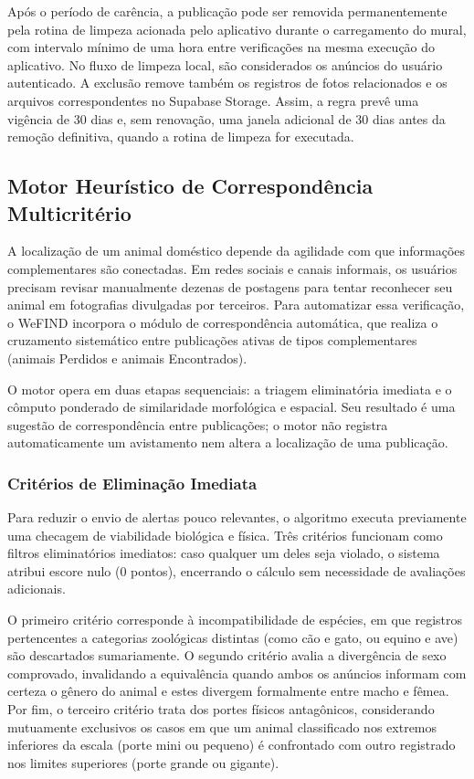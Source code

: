 Após o período de carência, a publicação pode ser removida permanentemente pela rotina de limpeza acionada pelo aplicativo durante o carregamento do mural, com intervalo mínimo de uma hora entre verificações na mesma execução do aplicativo. No fluxo de limpeza local, são considerados os anúncios do usuário autenticado. A exclusão remove também os registros de fotos relacionados e os arquivos correspondentes no Supabase Storage. Assim, a regra prevê uma vigência de 30 dias e, sem renovação, uma janela adicional de 30 dias antes da remoção definitiva, quando a rotina de limpeza for executada.

\subsection{Motor Heurístico de Correspondência Multicritério}

A localização de um animal doméstico depende da agilidade com que informações complementares são conectadas. Em redes sociais e canais informais, os usuários precisam revisar manualmente dezenas de postagens para tentar reconhecer seu animal em fotografias divulgadas por terceiros. Para automatizar essa verificação, o WeFIND incorpora o módulo de correspondência automática, que realiza o cruzamento sistemático entre publicações ativas de tipos complementares (animais Perdidos e animais Encontrados).

O motor opera em duas etapas sequenciais: a triagem eliminatória imediata e o cômputo ponderado de similaridade morfológica e espacial. Seu resultado é uma sugestão de correspondência entre publicações; o motor não registra automaticamente um avistamento nem altera a localização de uma publicação.

\subsubsection{Critérios de Eliminação Imediata}

Para reduzir o envio de alertas pouco relevantes, o algoritmo executa previamente uma checagem de viabilidade biológica e física. Três critérios funcionam como filtros eliminatórios imediatos: caso qualquer um deles seja violado, o sistema atribui escore nulo (0 pontos), encerrando o cálculo sem necessidade de avaliações adicionais.

O primeiro critério corresponde à incompatibilidade de espécies, em que registros pertencentes a categorias zoológicas distintas (como cão e gato, ou equino e ave) são descartados sumariamente. O segundo critério avalia a divergência de sexo comprovado, invalidando a equivalência quando ambos os anúncios informam com certeza o gênero do animal e estes divergem formalmente entre macho e fêmea. Por fim, o terceiro critério trata dos portes físicos antagônicos, considerando mutuamente exclusivos os casos em que um animal classificado nos extremos inferiores da escala (porte mini ou pequeno) é confrontado com outro registrado nos limites superiores (porte grande ou gigante).

